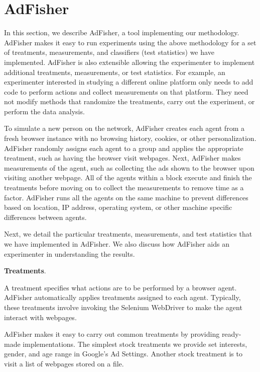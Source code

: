 \documentclass{article}
\makeatletter
\newcommand\gobblepars{\@ifnextchar\par {\expandafter\gobblepars\@gobble}{}}
\renewcommand{\paragraph}[1]{\smallskip\noindent\textbf{#1}.\ \ \gobblepars}
\makeatother
\begin{document}
\section{AdFisher}
\label{sec:tool}

In this section, we describe AdFisher, a tool implementing our methodology.
AdFisher makes it easy to run experiments using the above methodology for a set of treatments, measurements, and classifiers (test statistics) we have implemented.
AdFisher is also extensible allowing the experimenter to implement additional treatments, measurements, or test statistics.  
For example, an experimenter interested in studying a different online platform only needs to add code to perform actions and collect measurements on that platform.
They need not modify methods that randomize the treatments, carry out the experiment, or perform the data analysis. 



To simulate a new person on the network, AdFisher creates each agent from a fresh browser instance with no browsing history, cookies, or other personalization.
AdFisher randomly assigns each agent to a group and applies the appropriate treatment, such as having the browser visit webpages.
Next, AdFisher makes measurements of the agent, such as collecting the ads shown to the browser upon visiting another webpage.
All of the agents within a block execute and finish the treatments before moving on to collect the measurements to remove time as a factor.
AdFisher runs all the agents on the same machine to prevent differences based on location, IP address, operating system, or other machine specific differences between agents.


Next, we detail the particular treatments, measurements, and test statistics that we have implemented in AdFisher.
We also discuss how AdFisher aids an experimenter in understanding the results.

\paragraph{Treatments}\label{sec:treat}
A treatment specifies what actions are to be performed by a browser agent.
AdFisher automatically applies treatments assigned to each agent.  
Typically, these treatments involve invoking the Selenium WebDriver to make the agent interact with webpages.

AdFisher makes it easy to carry out common treatments by providing ready-made implementations.
The simplest stock treatments we provide set interests, gender, and age range in Google's Ad Settings.  Another stock treatment is to visit a list of webpages stored on a file.  
\end{document}
